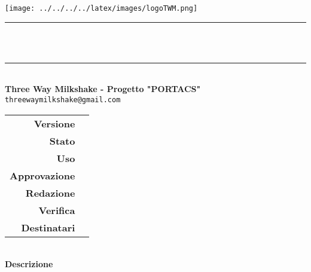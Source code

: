\thispagestyle{empty}
\begin{titlepage}
	\begin{center}
		
		\texttt{[image: ../../../../latex/images/logoTWM.png]}\\[0.7cm]
		

		\noindent\rule{\textwidth}{1pt} \\[0.4cm]
		\Huge \textbf{\doctitle} \\[0.1cm]
		\ifthenelse{\equal{\docdate}{ }}{ }{ \huge \textbf{\docdate} \\[0.1cm] }
		
		\noindent\rule{\textwidth}{1pt}\\[0.7cm]
		
		\large \textbf{Three Way Milkshake - Progetto "PORTACS"} \\[0.4cm] 
                \texttt{threewaymilkshake@gmail.com} \\[0.4cm]
                
		
        
        
        \large

        \begin{tabular}{r|l}
                        \textbf{Versione} & \rev{} \\
                        \textbf{Stato} & \stato{} \\
                        \textbf{Uso} & \uso{} \\                         
                        \textbf{Approvazione} & \approv{} \\                      
                        \textbf{Redazione} & \red{} \\ 
                        \textbf{Verifica} &  \ver{} \\                         
                        \textbf{Destinatari} & \parbox[t]{5cm}{ \dest{} }
                \end{tabular} 
                \\[0.3cm]
                \large \textbf{Descrizione} \\ \describedoc{} 
               

	\end{center}
\end{titlepage}